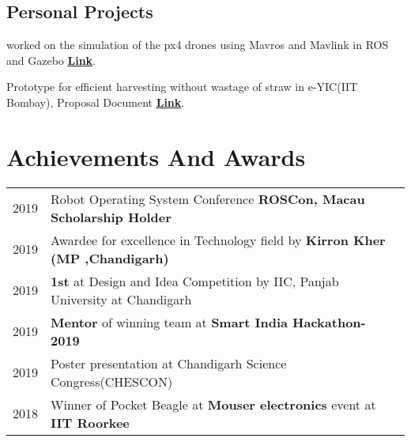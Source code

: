 \documentclass[]{font}
\begin{document}
\begin{minipage}[t]{0.69\textwidth}

\subsection{Personal Projects}


\textbullet{} worked on the simulation of the px4 drones using Mavros and Mavlink in ROS and Gazebo \underline{\textbf{\href{https://github.com/pranav083/Ros_projects}{Link}}}.  \\
\vspace{\topsep} %


\textbullet{} Prototype for efficient harvesting without wastage of straw in e-YIC(IIT Bombay), Proposal Document \underline{\textbf{\href{https://drive.google.com/file/d/0B0cF1Lq6c1cPcURJdkJjQmVFcFk3eTgtTGg5VktPVHJWWU5R/view?usp=sharing}{Link}}}.  \\



\section{\textbf{Achievements And Awards}} 
\begin{tabular}{rll}
2019         & Robot Operating System Conference \textbf{ROSCon, Macau Scholarship Holder}\\
2019         & Awardee for excellence in Technology field by \textbf{Kirron Kher (MP ,Chandigarh)}\\
2019         & \textbf{1st} at Design and Idea Competition by IIC, Panjab University at Chandigarh \\  
2019         & \textbf{Mentor} of winning team at \textbf{Smart India Hackathon-2019}\\
2019	     & Poster presentation at Chandigarh Science Congress(CHESCON)\\
2018	     & Winner of Pocket Beagle at \textbf{Mouser electronics} event at \textbf{IIT Roorkee} \\
\end{tabular}
\sectionsep


\end{minipage} 
\end{document}

